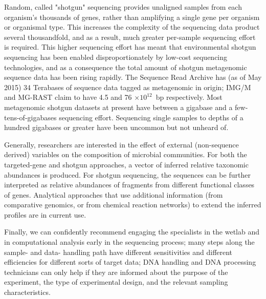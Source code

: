 \documentclass[graybox]{svmult}
\begin{document}
Random, called "shotgun" sequencing provides unaligned samples from each organism's thousands of genes, rather than amplifying a single gene per organism or organismal type.  This increases the complexity of the sequencing data product several thousandfold, and as a result, much greater per-sample sequencing effort is required.
This higher sequencing effort has meant that environmental shotgun sequencing has been enabled disproportionately by low-cost sequencing technologies, and as a consequence the total amount of shotgun metagenomic sequence data has been rising rapidly.   The Sequence Read Archive has (as of May 2015) 34 Terabases of sequence data tagged as metagenomic in origin; IMG/M and MG-RAST claim to have 4.5  and 76 $\times 10^{12}$~bp respectively. 
Most metagenomic shotgun datasets at present have between a gigabase and a few-tens-of-gigabases sequencing effort.  
Sequencing single samples to depths of a hundred gigabases or greater have been uncommon but not unheard of.

Generally, researchers are interested in the effect of external (non-sequence derived) variables on the composition of microbial communities.  For both the targeted-gene and shotgun approaches, a vector of inferred relative taxonomic abundances is produced.  For shotgun sequencing, the sequences can be further interpreted as relative abundances of fragments from different functional classes of genes.  Analytical approaches that use additional information (from comparative genomics, or from chemical reaction networks) to extend the inferred profiles are in current use.  

Finally, we can confidently recommend engaging the specialists in the wetlab and in computational analysis early in the sequencing process; many steps along the sample- and data- handling path have different sensitivities and different efficiencies for different sorts of target data; DNA handling and DNA processing technicians can only help if they are informed about the purpose of the experiment, the type of experimental design, and the relevant sampling characteristics.  
\end{document}
